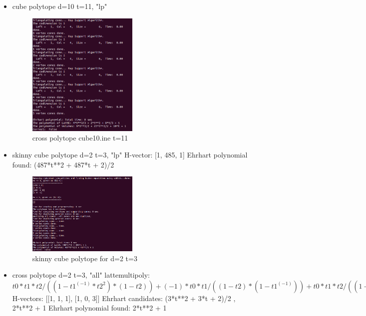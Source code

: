 \documentclass[12pt,twoside]{article}
\newcommand\tab[1][1cm]{\hspace*{#1}}
\begin{document}
\begin{itemize}


	\item cube polytope d=10 t=11, "lp"
	
	\begin{figure}[!h]
  		\centering
         	\includegraphics[width=0.50\textwidth]{cross3t5.png}
		\caption{cross polytope cube10.ine t=11}
	\end{figure}	
	
	\item skinny cube polytope d=2 t=3, "lp" \newline
	H-vector: [1, 485, 1] \newline
	Ehrhart polynomial found: (487*t**2 + 487*t + 2)/2 \newline
	
	\begin{figure}[!h]
  		\centering
         	\includegraphics[width=0.50\textwidth]{skinnycube2t3.png}
		\caption{skinny cube polytope for d=2 t=3}
	\end{figure}	
	
	
	\item cross polytope d=2 t=3, "all" \newline
	lattemultipoly:  $t0*t1*t2/((1-t1^(-1)*t2^2)*(1-t2)) + (-1)*t0*t1/((1-t2)*(1-t1^(-1))) + t0*t1*t2/((1-t1^(-1)*t2^2)*(1-t2^(-1))) + t0*t1/((1-t2)*(1-t1^(-1))) + t0*t2^3/((1-t1*t2^(-2))*(1-t2)) + t0*t2^3/((1-t1*t2^(-2))*(1-t2^(-1)))$ \newline
	H-vectors: [[1, 1, 1], [1, 0, 3]] \newline
	Ehrhart candidates: (3*t**2 + 3*t + 2)/2 ,\tab
	2*t**2 + 1 \newline
	Ehrhart polynomial found: 2*t**2 + 1\newline


\end{itemize}
\end{document}
